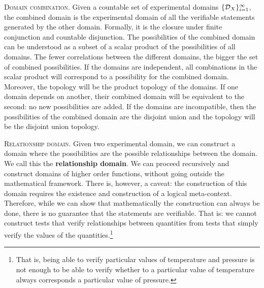 \documentclass[10pt,twocolumn, nofootinbib]{revtex4-1}
\newcommand\partitle[1]{\textsc{#1}.}
\begin{document}
\partitle{Domain combination} Given a countable set of experimental domains $\{\mathcal{D}_X\}_{i=1}^{\infty}$, the combined domain is the experimental domain of all the verifiable statements generated by the other domain. Formally, it is the closure under finite conjunction and countable disjunction. The possibilities of the combined domain can be understood as a subset of a scalar product of the possibilities of all domains. The fewer correlations between the different domains, the bigger the set of combined possibilities. If the domains are independent, all combinations in the scalar product will correspond to a possibility for the combined domain. Moreover, the topology will be the product topology of the domains. If one domain depends on another, their combined domain will be equivalent to the second: no new possibilities are added. If the domains are incompatible, then the possibilities of the combined domain are the disjoint union and the topology will be the disjoint union topology.

\partitle{Relationship domain} Given two experimental domain, we can construct a domain where the possibilities are the possible relationships between the domain. We call this the \textbf{relationship domain}. We can proceed recursively and construct domains of higher order functions, without going outside the mathematical framework. There is, however, a caveat: the construction of this domain requires the existence and construction of a logical meta-context. Therefore, while we can show that mathematically the construction can always be done, there is no guarantee that the statements are verifiable. That is: we cannot construct tests that verify relationships between quantities from tests that simply verify the values of the quantities.\footnote{That is, being able to verify particular values of temperature and pressure is not enough to be able to verify whether to a particular value of temperature always corresponds a particular value of pressure.}


\end{document}

